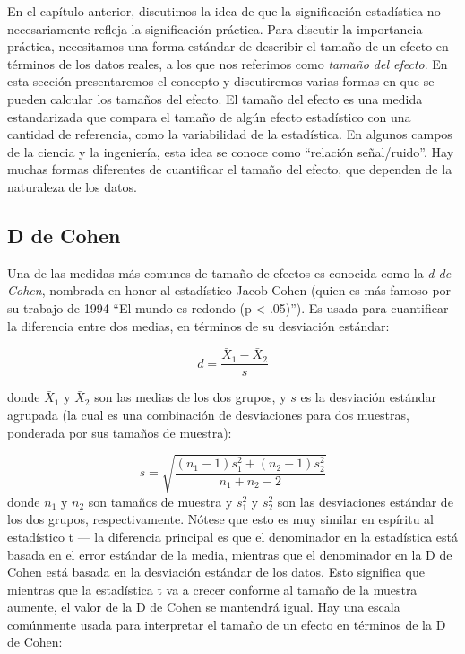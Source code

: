 \documentclass[
  12pt,
]{book}
\begin{document}
En el capítulo anterior, discutimos la idea de que la significación estadística no necesariamente refleja la significación práctica. Para discutir la importancia práctica, necesitamos una forma estándar de describir el tamaño de un efecto en términos de los datos reales, a los que nos referimos como \emph{tamaño del efecto}. En esta sección presentaremos el concepto y discutiremos varias formas en que se pueden calcular los tamaños del efecto.
El tamaño del efecto es una medida estandarizada que compara el tamaño de algún efecto estadístico con una cantidad de referencia, como la variabilidad de la estadística. En algunos campos de la ciencia y la ingeniería, esta idea se conoce como ``relación señal/ruido''. Hay muchas formas diferentes de cuantificar el tamaño del efecto, que dependen de la naturaleza de los datos.

\hypertarget{d-de-cohen}{%
\subsection{D de Cohen}\label{d-de-cohen}}

Una de las medidas más comunes de tamaño de efectos es conocida como la \emph{d de Cohen}, nombrada en honor al estadístico Jacob Cohen (quien es más famoso por su trabajo de 1994 ``El mundo es redondo (p \textless{} .05)''). Es usada para cuantificar la diferencia entre dos medias, en términos de su desviación estándar:

\[
d = \frac{\bar{X}_1 - \bar{X}_2}{s}
\]

donde \(\bar{X}_1\) y \(\bar{X}_2\) son las medias de los dos grupos, y \(s\) es la desviación estándar agrupada (la cual es una combinación de desviaciones para dos muestras, ponderada por sus tamaños de muestra):

\[
s = \sqrt{\frac{(n_1 - 1)s^2_1 + (n_2 - 1)s^2_2 }{n_1 +n_2 -2}}
\]
donde \(n_1\) y \(n_2\) son tamaños de muestra y \(s^2_1\) y \(s^2_2\) son las desviaciones estándar de los dos grupos, respectivamente. Nótese que esto es muy similar en espíritu al estadístico t --- la diferencia principal es que el denominador en la estadística está basada en el error estándar de la media, mientras que el denominador en la D de Cohen está basada en la desviación estándar de los datos. Esto significa que mientras que la estadística t va a crecer conforme al tamaño de la muestra aumente, el valor de la D de Cohen se mantendrá igual.
Hay una escala comúnmente usada para interpretar el tamaño de un efecto en términos de la D de Cohen:
\end{document}
